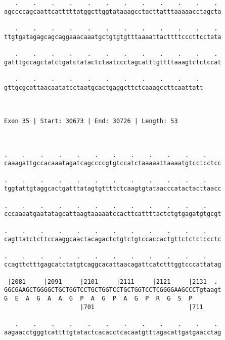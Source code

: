 \documentclass{article}
\begin{document}
\begin{Verbatim}
   .    .    .    .    .    .    .    .    .    .    .    . 
agccccagcaattcatttttatggcttggtataaagcctacttatttaaaaacctagcta
                                                            
   .    .    .    .    .    .    .    .    .    .    .    . 
ttgtgatagagcagcaggaaacaaatgctgtgtgtttaaaattacttttcccttcctata
                                                            
   .    .    .    .    .    .    .    .    .    .    .    . 
gatttgccagctatctgatctatactctaatccctagcatttgttttaaagtctctccat
                                                            
   .    .    .    .    .    .    .    .    .    .    . 
gttgcgcattaacaatatcctaatgcactgaggcttctcaaagccttcaattatt
                                                       
                                                       
 
Exon 35 | Start: 30673 | End: 30726 | Length: 53



.    .    .    .    .    .    .    .    .    .    .    .    
caaagattgccacaaatagatcagccccgtgtccatctaaaaattaaaatgtcctcctcc
                                                            
.    .    .    .    .    .    .    .    .    .    .    .    
tggtattgtaggcactgatttatagtgttttctcaagtgtataacccatactacttaacc
                                                            
.    .    .    .    .    .    .    .    .    .    .    .    
cccaaaatgaatatagcattaagtaaaaatccacttcattttactctgtgagatgtgcgt
                                                            
.    .    .    .    .    .    .    .    .    .    .    .    
cagttatctcttccaaggcaactacagactctgtctgtccaccactgttctctctccctc
                                                            
.    .    .    .    .    .    .    .    .    .    .    .    
ccagttctttgagcatctatgtcaggcacattaacagattcatctttggtcccattatag
                                                            
 |2081     |2091     |2101     |2111     |2121     |2131  . 
GGCGAAGCTGGGGCTGCTGGTCCTGCTGGTCCTGCTGGTCCTCGGGGAAGCCCTgtaagt
G  E  A  G  A  A  G  P  A  G  P  A  G  P  R  G  S  P        
                     |701                          |711     
  
   .    .    .    .    .    .    .    .    .    .    .    . 
aagaacctgggtcattttgtatactcacacctcacaatgtttagacattgatgaacctag
                                                            

\end{Verbatim}
\end{document}
